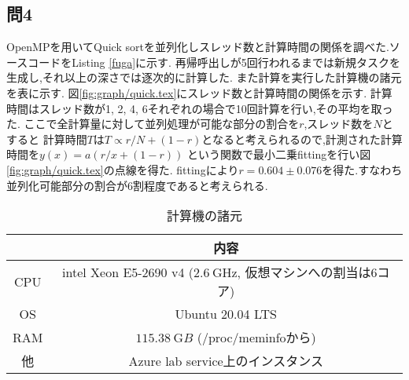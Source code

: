 \subsection*{問4}
OpenMPを用いてQuick sortを並列化しスレッド数と計算時間の関係を調べた.ソースコードをListing \ref{fuga}に示す.
再帰呼出しが5回行われるまでは新規タスクを生成し,それ以上の深さでは逐次的に計算した.
また計算を実行した計算機の諸元を表に示す.
図\ref{fig:graph/quick.tex}にスレッド数と計算時間の関係を示す.
計算時間はスレッド数が1, 2, 4, 6それぞれの場合で10回計算を行い,その平均を取った.
ここで全計算量に対して並列処理が可能な部分の割合を$r$,スレッド数を$N$とすると
計算時間$T$は$T\propto r/N+(1-r)$となると考えられるので,計測された計算時間を$y(x)=a(r/x+(1-r))$
という関数で最小二乗fittingを行い図\ref{fig:graph/quick.tex}の点線を得た.
fittingにより$r=0.604\pm0.076$を得た.すなわち並列化可能部分の割合が6割程度であると考えられる.
\begin{table}[h]
\caption{計算機の諸元}
\label{tab:syogen}
\centering
\begin{tabular}{cc}
\hline
&内容\\
\hline \hline
CPU&intel Xeon E5-2690 v4 ($2.6\ \si{\giga\hertz}$, 仮想マシンへの割当は6コア)\\
OS&Ubuntu 20.04 LTS\\
RAM&$115.38\ \si{\giga B}$ (/proc/meminfoから)\\
他&Azure lab service上のインスタンス\\
\hline
\end{tabular}
\end{table}